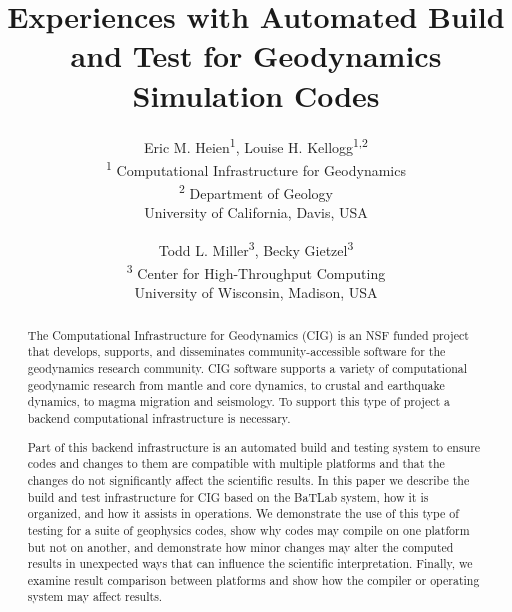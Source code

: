 \documentclass{acm_proc_article-sp}
\begin{document}
\title{Experiences with Automated Build and Test for Geodynamics Simulation Codes}


\author{ 
        Eric M. Heien\textsuperscript{1}, Louise H. Kellogg\textsuperscript{1,2} \\
        \textsuperscript{1} Computational Infrastructure for Geodynamics\\
        \textsuperscript{2} Department of Geology\\
        University of California, Davis, USA
            \and
        Todd L. Miller\textsuperscript{3}, Becky Gietzel\textsuperscript{3}\\
        \textsuperscript{3} Center for High-Throughput Computing\\
        University of Wisconsin, Madison, USA
}

\maketitle

\begin{abstract}
The Computational Infrastructure for Geodynamics (CIG) is an NSF funded project that develops, supports, and disseminates community-accessible software for the geodynamics research community. CIG software supports a variety of computational geodynamic research from mantle and core dynamics, to crustal and earthquake dynamics, to magma migration and seismology.  To support this type of project a backend computational infrastructure is necessary.

Part of this backend infrastructure is an automated build and testing system to ensure codes and changes to them are compatible with multiple platforms and that the changes do not significantly affect the scientific results.  In this paper we describe the build and test infrastructure for CIG based on the BaTLab system, how it is organized, and how it assists in operations.  We demonstrate the use of this type of testing for a suite of geophysics codes, show why codes may compile on one platform but not on another, and demonstrate how minor changes may alter the computed results in unexpected ways that can influence the scientific interpretation.  Finally, we examine result comparison between platforms and show how the compiler or operating system may affect results.

\end{abstract}
\end{document}
